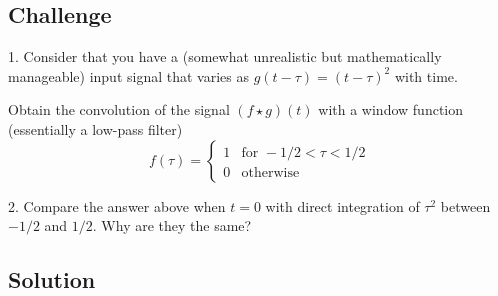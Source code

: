 \subsection*{Challenge}
1. Consider that you have a (somewhat unrealistic but mathematically manageable) input signal that varies as $g(t-\tau)=(t-\tau)^2$ with time. 

Obtain the convolution of the signal $(f \star g)(t)$ with a window function (essentially a low-pass filter)
\begin{equation}
    f(\tau)=
    \begin{cases}
        1 & \text{for } -1/2 < \tau < 1/2\\
        0 & \text{otherwise}
    \end{cases}
\end{equation}

2. Compare the answer above when $t=0$ with direct integration of $\tau^2$ between $-1/2$ and $1/2$. Why are they the same?

\subsection*{Solution}

\timebox




%
%
%
%
%




